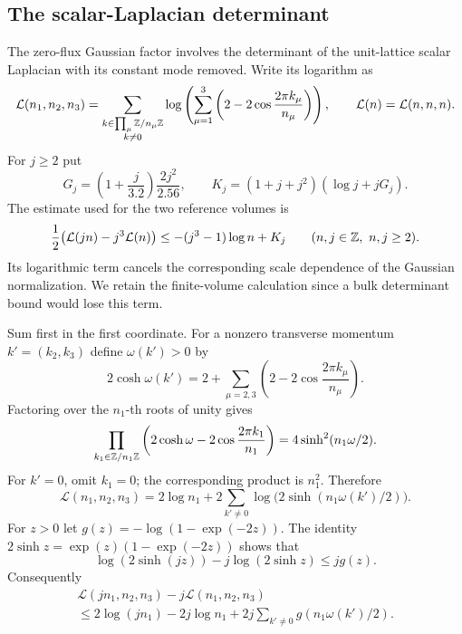 \subsection{The scalar-Laplacian determinant}

The zero-flux Gaussian factor involves the determinant of the
unit-lattice scalar Laplacian with its constant mode removed.
Write its logarithm as
\[
 \mathcal L(n_1,n_2,n_3)
  =\sum_{\substack{k\in\prod_\mu\mathbb Z/n_\mu\mathbb Z\\k\ne0}}
      \log\left(\sum_{\mu=1}^3
                       \left(2-2\cos\frac{2\pi k_\mu}{n_\mu}\right)\right),
 \qquad \mathcal L(n)=\mathcal L(n,n,n).
\]
For $j\ge2$ put
\[
 G_j=\left(1+\frac j{3.2}\right)\frac{2j^2}{2.56},\qquad
 K_j=(1+j+j^2)(\log j+jG_j).
\]
The estimate used for the two reference volumes is
\begin{equation}\label{eq:transfer-photon-logdet}
 \frac12\bigl(\mathcal L(jn)-j^3\mathcal L(n)\bigr)
              \le-(j^3-1)\log n+K_j
                   \qquad(n,j\in\mathbb Z,\ n,j\ge2).
\end{equation}
Its logarithmic term cancels the corresponding scale dependence
of the Gaussian normalization. We retain the finite-volume
calculation since a bulk determinant bound would lose this term.

Sum first in the first coordinate. For a nonzero transverse
momentum $k'=(k_2,k_3)$ define $\omega(k')>0$ by
\[
 2\cosh\omega(k')
     =2+\sum_{\mu=2,3}
                 \left(2-2\cos\frac{2\pi k_\mu}{n_\mu}\right).
\]
Factoring over the $n_1$-th roots of unity gives
\[
 \prod_{k_1\in\mathbb Z/n_1\mathbb Z}
       \left(2\cosh\omega-2\cos\frac{2\pi k_1}{n_1}\right)
                       =4\sinh^2(n_1\omega/2).
\]
For $k'=0$, omit $k_1=0$; the corresponding product is $n_1^2$.
Therefore
\begin{equation}\label{eq:transfer-photon-one-direction}
 \mathcal L(n_1,n_2,n_3)
   =2\log n_1+
       2\sum_{k'\ne0}\log\bigl(2\sinh(n_1\omega(k')/2)\bigr).
\end{equation}
For $z>0$ let $g(z)=-\log(1-\exp(-2z))$.
The identity $2\sinh z=\exp(z)(1-\exp(-2z))$ shows that
\[
 \log(2\sinh(jz))-j\log(2\sinh z)\le jg(z).
\]
Consequently
\begin{multline}\label{eq:transfer-photon-side-difference}
 \mathcal L(jn_1,n_2,n_3)-j\mathcal L(n_1,n_2,n_3)\\
 \le2\log(jn_1)-2j\log n_1
                       +2j\sum_{k'\ne0}g(n_1\omega(k')/2).
\end{multline}

